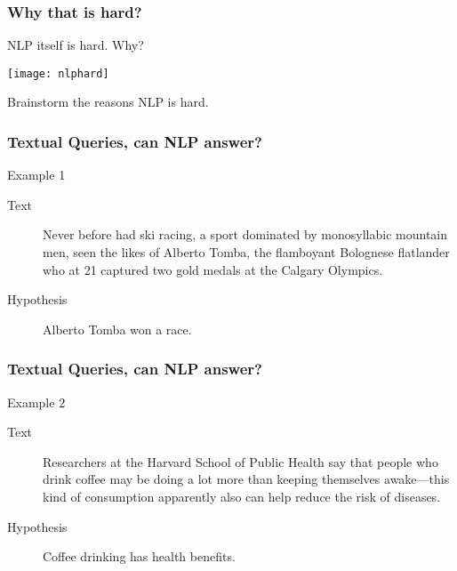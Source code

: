   
\begin{frame}[fragile]\frametitle{Why that is hard?}
NLP itself is hard. Why?
\begin{center}
\texttt{[image: nlphard]}
\end{center}
Brainstorm the reasons NLP is hard.
\end{frame}


\begin{frame}[fragile]\frametitle{Textual Queries, can NLP answer?}
\begin{exampleblock}{Example 1}
  \begin{description}
    \item [Text] Never before had ski racing, a sport dominated by
      monosyllabic mountain men, seen the likes of Alberto Tomba, the
      flamboyant Bolognese flatlander who at 21 captured two gold
      medals at the Calgary Olympics.
    \item [Hypothesis] Alberto Tomba won a race.
  \end{description}
\end{exampleblock}
\end{frame}

\begin{frame}[fragile]\frametitle{Textual Queries, can NLP answer?}
\begin{exampleblock}{Example 2}
  \begin{description}
    \item [Text] Researchers at the Harvard School of Public Health
      say that people who drink coffee may be doing a lot more than
      keeping themselves awake---this kind of consumption apparently
      also can help reduce the risk of diseases.
    \item [Hypothesis] Coffee drinking has health benefits.
  \end{description}
\end{exampleblock}
\end{frame}


